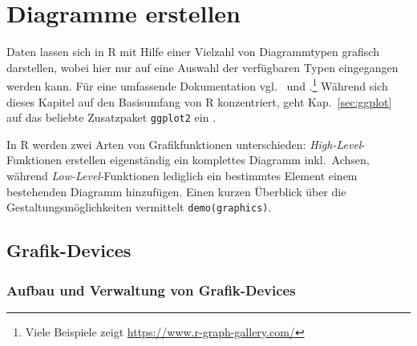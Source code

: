 \chapter{Diagramme erstellen}
\label{sec:graphics}

Daten lassen sich in R mit Hilfe einer Vielzahl von Diagrammtypen grafisch darstellen, wobei hier nur auf eine Auswahl der verfügbaren Typen eingegangen werden kann. Für eine umfassende Dokumentation vgl.\  und .\footnote{Viele Beispiele zeigt \url{https://www.r-graph-gallery.com/}} Während sich dieses Kapitel auf den Basisumfang von R konzentriert, geht Kap.\ \ref{sec:ggplot} auf das beliebte Zusatzpaket \lstinline!ggplot2! ein \cite{Wickham2009a}.

In R werden zwei Arten von Grafikfunktionen unterschieden: \emph{High-Level}-Funktionen erstellen eigenständig ein komplettes Diagramm inkl.\ Achsen, während \emph{Low-Level}-Funktionen lediglich ein bestimmtes Element einem bestehenden Diagramm hinzufügen. Einen kurzen Überblick über die Gestaltungsmöglichkeiten vermittelt \lstinline!demo(graphics)!.

\section{Grafik-Devices}

\subsection{Aufbau und Verwaltung von Grafik-Devices}
\label{sec:device}

